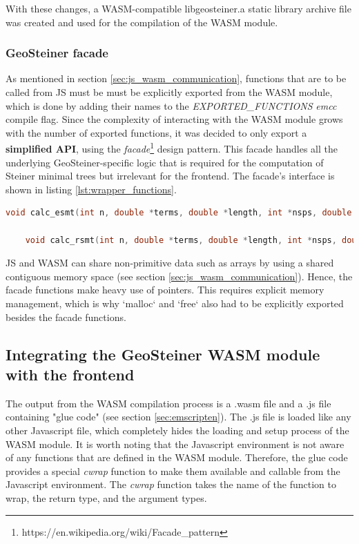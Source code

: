 \documentclass{l4proj}
\begin{document}
With these changes, a WASM-compatible libgeosteiner.a static library archive file was created and used for the compilation of the WASM module.

\subsubsection{GeoSteiner facade}
As mentioned in section \ref{sec:js_wasm_communication}, functions that are to be called from JS must be must be explicitly exported from the WASM module, which is done by adding their names to the \textit{EXPORTED\_FUNCTIONS} \textit{emcc} compile flag.
Since the complexity of interacting with the WASM module grows with the number of exported functions, it was decided to only export a \textbf{simplified API}, using the \textit{facade}\footnote{https://en.wikipedia.org/wiki/Facade\_pattern} design pattern. This facade handles all the underlying GeoSteiner-specific logic that is required for the computation of Steiner minimal trees but irrelevant for the frontend. The facade's interface is shown in listing \ref{lst:wrapper_functions}.

\begin{lstlisting}[language=C,caption=Wrapper functions for the Geosteiner library,label=lst:wrapper_functions]
    void calc_esmt(int n, double *terms, double *length, int *nsps, double *sps, int *nedges, int *edges);

    void calc_rsmt(int n, double *terms, double *length, int *nsps, double *sps, int *nedges, int *edges);
\end{lstlisting}

JS and WASM can share non-primitive data such as arrays by using a shared contiguous memory space (see section \ref{sec:js_wasm_communication}). Hence, the facade functions make heavy use of pointers. This requires explicit memory management, which is why `malloc` and `free` also had to be explicitly exported besides the facade functions.

\subsection{Integrating the GeoSteiner WASM module with the frontend}
The output from the WASM compilation process is a .wasm file and a .js file containing "glue code" (see section \ref{sec:emscripten}). The .js file is loaded like any other Javascript file, which completely hides the loading and setup process of the WASM module.
It is worth noting that the Javascript environment is not aware of any functions that are defined in the WASM module. Therefore, the glue code provides a special \textit{cwrap} function to make them available and callable from the Javascript environment. The \textit{cwrap} function takes the name of the function to wrap, the return type, and the argument types.
\end{document}
